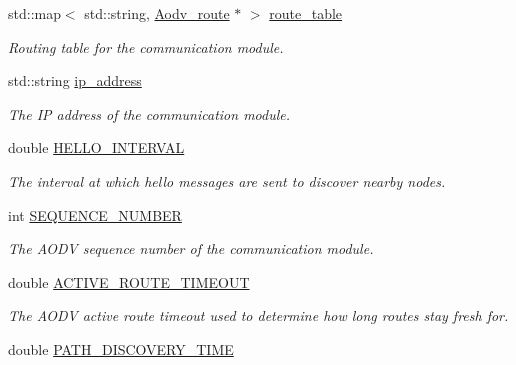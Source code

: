 \begin{DoxyCompactItemize}
\item 
std\+::map$<$ std\+::string, \hyperlink{class_aodv__route}{Aodv\+\_\+route} $\ast$ $>$ \hyperlink{class_aodv_a047b49a033b7b57a1b55e317327e3ed9}{route\+\_\+table}\hypertarget{class_aodv_a047b49a033b7b57a1b55e317327e3ed9}{}\label{class_aodv_a047b49a033b7b57a1b55e317327e3ed9}

\begin{DoxyCompactList}\small\item\em Routing table for the communication module. \end{DoxyCompactList}\item 
std\+::string \hyperlink{class_aodv_a1ff263311c122849d83e4cf81e916300}{ip\+\_\+address}\hypertarget{class_aodv_a1ff263311c122849d83e4cf81e916300}{}\label{class_aodv_a1ff263311c122849d83e4cf81e916300}

\begin{DoxyCompactList}\small\item\em The IP address of the communication module. \end{DoxyCompactList}\item 
double \hyperlink{class_aodv_ae1b6708bc0d8128640e09a25a8b474c2}{H\+E\+L\+L\+O\+\_\+\+I\+N\+T\+E\+R\+V\+AL}\hypertarget{class_aodv_ae1b6708bc0d8128640e09a25a8b474c2}{}\label{class_aodv_ae1b6708bc0d8128640e09a25a8b474c2}

\begin{DoxyCompactList}\small\item\em The interval at which hello messages are sent to discover nearby nodes. \end{DoxyCompactList}\item 
int \hyperlink{class_aodv_abd363aa026f2940eae40be57e44262a5}{S\+E\+Q\+U\+E\+N\+C\+E\+\_\+\+N\+U\+M\+B\+ER}\hypertarget{class_aodv_abd363aa026f2940eae40be57e44262a5}{}\label{class_aodv_abd363aa026f2940eae40be57e44262a5}

\begin{DoxyCompactList}\small\item\em The A\+O\+DV sequence number of the communication module. \end{DoxyCompactList}\item 
double \hyperlink{class_aodv_a6f5b0a4eea4017685807c23abbe6ff46}{A\+C\+T\+I\+V\+E\+\_\+\+R\+O\+U\+T\+E\+\_\+\+T\+I\+M\+E\+O\+UT}\hypertarget{class_aodv_a6f5b0a4eea4017685807c23abbe6ff46}{}\label{class_aodv_a6f5b0a4eea4017685807c23abbe6ff46}

\begin{DoxyCompactList}\small\item\em The A\+O\+DV active route timeout used to determine how long routes stay fresh for. \end{DoxyCompactList}\item 
double \hyperlink{class_aodv_a2111bf2e8bae4baf6000795fb1fd472b}{P\+A\+T\+H\+\_\+\+D\+I\+S\+C\+O\+V\+E\+R\+Y\+\_\+\+T\+I\+ME}\hypertarget{class_aodv_a2111bf2e8bae4baf6000795fb1fd472b}{}\label{class_aodv_a2111bf2e8bae4baf6000795fb1fd472b}


\end{DoxyCompactItemize}
